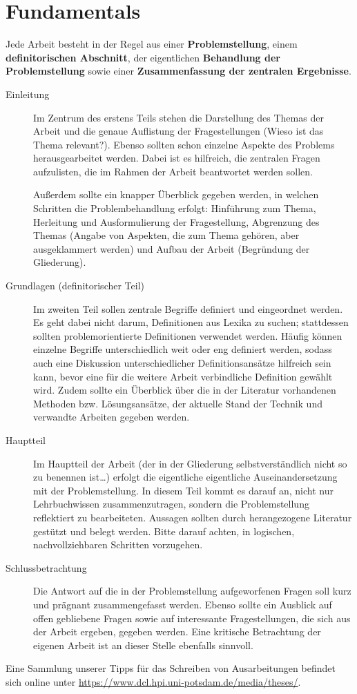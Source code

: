 \chapter{Fundamentals}

Jede Arbeit besteht in der Regel aus einer \textbf{Problemstellung}, einem \textbf{definitorischen Abschnitt}, der eigentlichen \textbf{Behandlung der Problemstellung} sowie einer \textbf{Zusammenfassung der zentralen Ergebnisse}.

\begin{description}

	\item[Einleitung] Im Zentrum des erstens Teils stehen die Darstellung des Themas der Arbeit und die genaue Auflistung der Fragestellungen (Wieso ist das Thema relevant?). Ebenso sollten schon einzelne Aspekte des Problems herausgearbeitet werden. Dabei ist es hilfreich, die zentralen Fragen aufzulisten, die im Rahmen der Arbeit beantwortet werden sollen.
	
	Außerdem sollte ein knapper Überblick gegeben werden, in welchen Schritten die Problembehandlung erfolgt: Hinführung zum Thema, Herleitung und Ausformulierung der Fragestellung, Abgrenzung des Themas (Angabe von Aspekten, die zum Thema gehören, aber ausgeklammert werden) und Aufbau der Arbeit (Begründung der Gliederung).
	
	\item[Grundlagen (definitorischer Teil)] Im zweiten Teil sollen zentrale Begriffe definiert und eingeordnet werden. Es geht dabei nicht darum, Definitionen aus Lexika zu suchen; stattdessen sollten problemorientierte Definitionen verwendet werden. Häufig können einzelne Begriffe unterschiedlich weit oder eng definiert werden, sodass auch eine Diskussion unterschiedlicher Definitionsansätze hilfreich sein kann, bevor eine für die weitere Arbeit verbindliche Definition gewählt wird. Zudem sollte ein Überblick über die in der Literatur vorhandenen Methoden bzw. Lösungsansätze, der aktuelle Stand der Technik und verwandte Arbeiten gegeben werden.
	
	\item[Hauptteil] Im Hauptteil der Arbeit (der in der Gliederung selbstverständlich nicht so zu benennen ist\ldots) erfolgt die eigentliche eigentliche Auseinandersetzung mit der Problemstellung. In diesem Teil kommt es darauf an, nicht nur Lehrbuchwissen zusammenzutragen, sondern die Problemstellung reflektiert zu bearbeiteten. Aussagen sollten durch herangezogene Literatur gestützt und belegt werden. Bitte darauf achten, in logischen, nachvollziehbaren Schritten vorzugehen.
	
	\item[Schlussbetrachtung] Die Antwort auf die in der Problemstellung aufgeworfenen Fragen soll kurz und prägnant zusammengefasst werden. Ebenso sollte ein Ausblick auf offen gebliebene Fragen sowie auf interessante Fragestellungen, die sich aus der Arbeit ergeben, gegeben werden. Eine kritische Betrachtung der eigenen Arbeit ist an dieser Stelle ebenfalls sinnvoll.

\end{description}

\noindent
Eine Sammlung unserer Tipps für das Schreiben von Ausarbeitungen befindet sich online unter \url{https://www.dcl.hpi.uni-potsdam.de/media/theses/}.